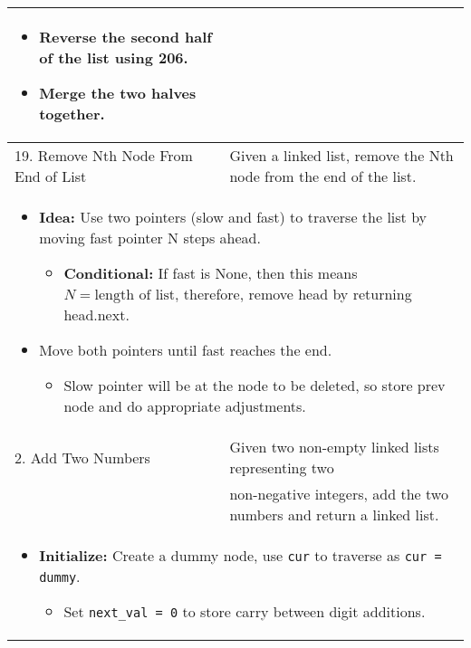 \begin{summary}
\begin{center}
\begin{tabular}{ll}
{\begin{itemize}
                        \item Reverse the second half of the list using 206. 
                        \item Merge the two halves together.
                    \end{itemize}
                } \\
                \midrule 
                19. Remove Nth Node From End of List & Given a linked list, remove the Nth node from the end of the list. \\
                \multicolumn{2}{p{\linewidth}}{
                    \begin{itemize}
                        \item \textbf{Idea:} Use two pointers (slow and fast) to traverse the list by moving fast pointer N steps ahead. 
                        \begin{itemize}
                            \item \textbf{Conditional:} If fast is None, then this means $N=\text{length of list}$, therefore, remove head by returning head.next.
                        \end{itemize}
                        \item Move both pointers until fast reaches the end. 
                        \begin{itemize}
                            \item Slow pointer will be at the node to be deleted, so store prev node and do appropriate adjustments. 
                        \end{itemize}
                    \end{itemize}
                } \\
                \midrule
                2. Add Two Numbers & Given two non-empty linked lists representing two \\
                & non-negative integers, add the two numbers and return a linked list. \\
                \multicolumn{2}{p{\linewidth}}{
                    \begin{itemize}
                        \item \textbf{Initialize:} Create a dummy node, use \texttt{cur} to traverse as \texttt{cur = dummy}.
                        \begin{itemize}
                            \item Set \texttt{next\_val = 0} to store carry between digit additions.
                        \end{itemize}

\end{itemize}}
\end{tabular}
\end{center}
\end{summary}
